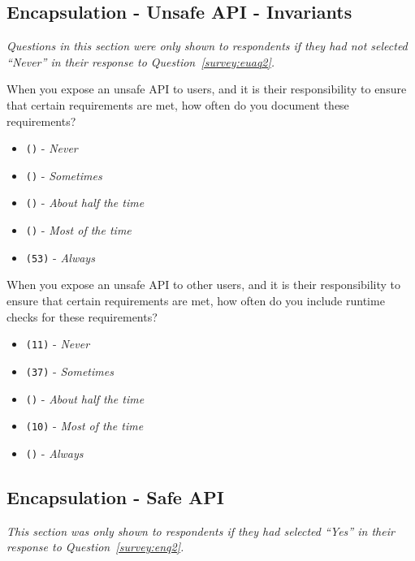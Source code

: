 \subsection{Encapsulation - Unsafe API - Invariants}
\label{survey:sec:euaiq}
\textit{Questions in this section were only shown to respondents if they had not selected ``\textit{Never}'' in their response to Question~\ref{survey:euaq2}.}

\begin{protocol}
\item \label{survey:euaiq1}  When you expose an unsafe API to users, and it is their responsibility to ensure that certain requirements are met, how often do you document these requirements?
\begin{itemize}
\item \texttt{()} - \textit{Never}
\item \texttt{()} - \textit{Sometimes}
\item \texttt{()} - \textit{About half the time}
\item \texttt{()} - \textit{Most of the time}
\item \texttt{(53)} - \textit{Always}

\end{itemize}
\item \label{survey:euaiq2}  When you expose an unsafe API to other users, and it is their responsibility to ensure that certain requirements are met, how often do you include runtime checks for these requirements?
\begin{itemize}
\item \texttt{(11)} - \textit{Never}
\item \texttt{(37)} - \textit{Sometimes}
\item \texttt{()} - \textit{About half the time}
\item \texttt{(10)} - \textit{Most of the time}
\item \texttt{()} - \textit{Always}
\end{itemize}
\end{protocol}

\subsection{Encapsulation - Safe API}
\label{survey:sec:esaq}
\textit{This section was only shown to respondents if they had selected ``\textit{Yes}'' in their response to Question~\ref{survey:enq2}.}


